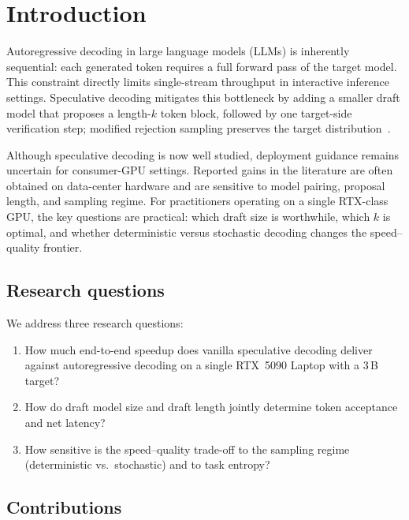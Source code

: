 \section{Introduction}

Autoregressive decoding in large language models (LLMs) is inherently
sequential: each generated token requires a full forward pass of the target
model. This constraint directly limits single-stream throughput in interactive
inference settings. Speculative decoding mitigates this bottleneck by adding a
smaller draft model that proposes a length-$k$ token block, followed by one
target-side verification step; modified rejection sampling preserves the target
distribution~\cite{Leviathan2023,Chen2023specsampling}.

Although speculative decoding is now well studied, deployment guidance remains
uncertain for consumer-GPU settings. Reported gains in the literature are often
obtained on data-center hardware and are sensitive to model pairing, proposal
length, and sampling regime. For practitioners operating on a single RTX-class
GPU, the key questions are practical: which draft size is worthwhile, which
$k$ is optimal, and whether deterministic versus stochastic decoding changes
the speed--quality frontier.

\subsection{Research questions}
\label{sec:rqs}

We address three research questions:
\begin{enumerate}\itemsep0pt
  \item[\textbf{RQ1.}] How much end-to-end speedup does vanilla
        speculative decoding deliver against autoregressive decoding on a
        single RTX~5090 Laptop with a 3\,B target?
  \item[\textbf{RQ2.}] How do draft model size and draft length jointly
        determine token acceptance and net latency?
  \item[\textbf{RQ3.}] How sensitive is the speed--quality trade-off to
        the sampling regime (deterministic vs.\ stochastic) and to task
        entropy?
\end{enumerate}

\subsection{Contributions}
\label{sec:contributions}

